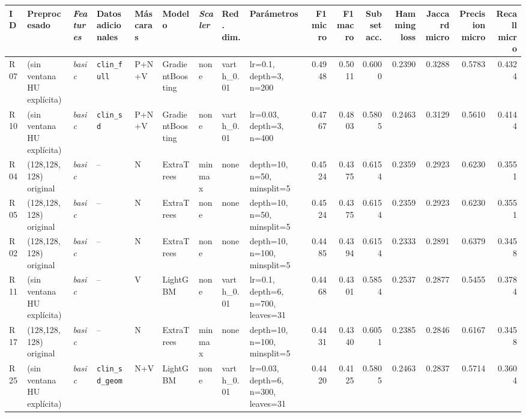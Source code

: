 \begin{landscape}
\begin{table}[p]
\centering
\tiny
\setlength{\tabcolsep}{1.2pt}
\renewcommand{\arraystretch}{0.85}

\begin{adjustbox}{
    max width=\linewidth,
    max height=0.88\textheight,
    keepaspectratio
}
\begin{tabular}{l l l l l l l l l r r r r r r r}
\hline
ID & Preprocesado & \textit{Features} & Datos adicionales & Máscaras &
Modelo & \textit{Scaler} & Red. dim. & Parámetros &
F1 micro & F1 macro & Subset acc. & Hamming loss &
Jaccard micro & Precision micro & Recall micro \\
\hline
R07 & (sin ventana HU explícita) & \textit{basic} & \texttt{clin\_full} & P+N+V & GradientBoosting & none & varth\_0.01 & lr=0.1, depth=3, n=200 & 0.4948 & 0.5011 & 0.6000 & 0.2390 & 0.3288 & 0.5783 & 0.4324 \\
R10 & (sin ventana HU explícita) & \textit{basic} & \texttt{clin\_sd} & P+N+V & GradientBoosting & none & varth\_0.01 & lr=0.03, depth=3, n=400 & 0.4767 & 0.4803 & 0.5805 & 0.2463 & 0.3129 & 0.5610 & 0.4144 \\
R04 & (128,128,128) original & \textit{basic} & -- & N & ExtraTrees & minmax & none & depth=10, n=50, minsplit=5 & 0.4524 & 0.4375 & 0.6154 & 0.2359 & 0.2923 & 0.6230 & 0.3551 \\
R05 & (128,128,128) original & \textit{basic} & -- & N & ExtraTrees & none & none & depth=10, n=50, minsplit=5 & 0.4524 & 0.4375 & 0.6154 & 0.2359 & 0.2923 & 0.6230 & 0.3551 \\
R02 & (128,128,128) original & \textit{basic} & -- & N & ExtraTrees & none & none & depth=10, n=100, minsplit=5 & 0.4485 & 0.4394 & 0.6154 & 0.2333 & 0.2891 & 0.6379 & 0.3458 \\
R11 & (sin ventana HU explícita) & \textit{basic} & -- & V & LightGBM & none & varth\_0.01 & lr=0.1, depth=6, n=700, leaves=31 & 0.4468 & 0.4301 & 0.5854 & 0.2537 & 0.2877 & 0.5455 & 0.3784 \\
R17 & (128,128,128) original & \textit{basic} & -- & N & ExtraTrees & minmax & none & depth=10, n=100, minsplit=5 & 0.4431 & 0.4340 & 0.6051 & 0.2385 & 0.2846 & 0.6167 & 0.3458 \\
R25 & (sin ventana HU explícita) & \textit{basic} & \texttt{clin\_sd\_geom} & N+V & LightGBM & none & varth\_0.01 & lr=0.03, depth=6, n=300, leaves=31 & 0.4420 & 0.4125 & 0.5805 & 0.2463 & 0.2837 & 0.5714 & 0.3604 \\

\end{tabular}
\end{adjustbox}
\end{table}
\end{landscape}
